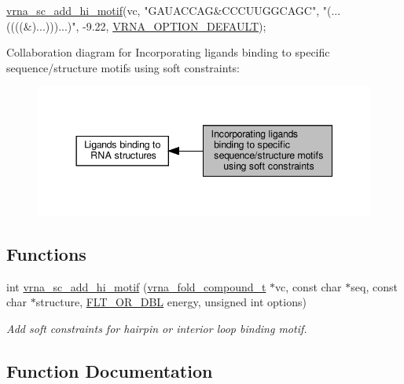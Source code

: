 \begin{DoxyCode}
\hyperlink{group__constraints__ligand_gaa6ff0113a3a76dc0b8d62961f4e1dfa0}{vrna\_sc\_add\_hi\_motif}(vc,
                   \textcolor{stringliteral}{"GAUACCAG&CCCUUGGCAGC"},
                   \textcolor{stringliteral}{"(...((((&)...)))...)"},
                   -9.22, \hyperlink{group__fold__compound_gacea5b7ee6181c485f36e2afa0e9089e4}{VRNA\_OPTION\_DEFAULT}); 
\end{DoxyCode}
 Collaboration diagram for Incorporating ligands binding to specific sequence/structure motifs using soft constraints\+:
\nopagebreak
\begin{figure}[H]
\begin{center}
\leavevmode
\includegraphics[width=344pt]{group__constraints__ligand}
\end{center}
\end{figure}
\subsection*{Functions}
\begin{DoxyCompactItemize}
\item 
int \hyperlink{group__constraints__ligand_gaa6ff0113a3a76dc0b8d62961f4e1dfa0}{vrna\+\_\+sc\+\_\+add\+\_\+hi\+\_\+motif} (\hyperlink{group__fold__compound_ga1b0cef17fd40466cef5968eaeeff6166}{vrna\+\_\+fold\+\_\+compound\+\_\+t} $\ast$vc, const char $\ast$seq, const char $\ast$structure, \hyperlink{group__data__structures_ga31125aeace516926bf7f251f759b6126}{F\+L\+T\+\_\+\+O\+R\+\_\+\+D\+BL} energy, unsigned int options)
\begin{DoxyCompactList}\small\item\em Add soft constraints for hairpin or interior loop binding motif. \end{DoxyCompactList}\end{DoxyCompactItemize}


\subsection{Function Documentation}
\mbox{\label{group__constraints__ligand_gaa6ff0113a3a76dc0b8d62961f4e1dfa0}} 
